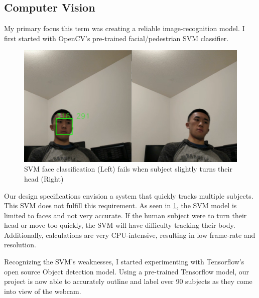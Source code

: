 \documentclass[onecolumn, draftclsnofoot,10pt, compsoc]{IEEEtran}
\makeatletter
\newcommand\captionof[1]{\def\@captype{#1}\caption}
\makeatother
\begin{document}
\begin{singlespace}
		\subsection{Computer Vision}
			My primary focus this term was creating a reliable image-recognition model.
			I first started with OpenCV's pre-trained facial/pedestrian SVM classifier.
			\begin{figure}[here]
			\includegraphics[scale=0.5, width=\textwidth]{svm.PNG}
			\captionof{figure}{SVM face classification (Left) fails when subject slightly turns their head (Right)}
			\label{svm}
			\end{figure}
			Our design specifications envision a system that quickly tracks multiple subjects.
			This SVM does not fulfill this requirement.
			As seen in \ref{svm}, the SVM model is limited to faces and not very accurate.
			If the human subject were to turn their head or move too quickly, the SVM will have difficulty tracking their body.
			Additionally, calculations are very CPU-intensive, resulting in low frame-rate and resolution.
			

			Recognizing the SVM's weaknesses, I started experimenting with Tensorflow's open source Object detection model. 
			Using a pre-trained Tensorflow model, our project is now able to accurately outline and label over 90 subjects as they come into view of the webcam.
			

\end{singlespace}
\end{document}

